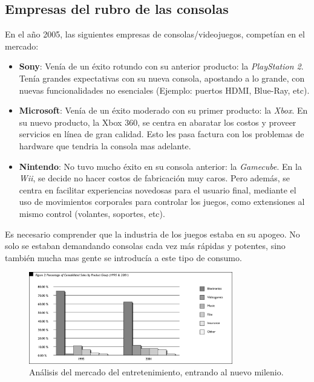 \documentclass[10pt,compsoc]{IEEEtran}
\begin{document}
	\subsection{Empresas del rubro de las consolas}
	\noindent 
	En el año 2005, las siguientes empresas de consolas/videojuegos, competían en el mercado: 
	\begin{itemize}
		\item{{\bf{Sony}}: Venía de un éxito rotundo con su anterior producto: la \textit{PlayStation 2}. Tenía grandes expectativas con su nueva consola, apostando a lo grande, con nuevas funcionalidades no esenciales (Ejemplo: puertos HDMI, Blue-Ray, etc).}
		
		\item{{\bf{Microsoft}}: Venía de un éxito moderado con su primer producto: la \textit{Xbox}. En su nuevo producto, la Xbox 360, se centra en abaratar los costos y proveer servicios en línea de gran calidad. Esto les pasa factura con los problemas de hardware que tendria la consola mas adelante.}
		
		\item{{\bf{Nintendo}}: No tuvo mucho éxito en su consola anterior: la \textit{Gamecube}. En la \textit{Wii}, se decide no hacer costos de fabricación muy caros. Pero además, se centra en facilitar experiencias novedosas para el usuario final, mediante el uso de movimientos corporales para controlar los juegos, como extensiones al mismo control (volantes, soportes, etc).}
	\end{itemize}
	
	Es necesario comprender que la industria de los juegos estaba en su apogeo. No solo se estaban demandando consolas cada vez más rápidas y potentes, sino también mucha mas gente se introducía a este tipo de consumo.
	

	
	\begin{figure}[H]
	\centering
	\includegraphics[width=3.5in]{imgs/gamingshare.png}
	\caption{Análisis del mercado del entretenimiento, entrando al nuevo milenio.}
	\label{fig2}
	\end{figure}
	
\end{document}

